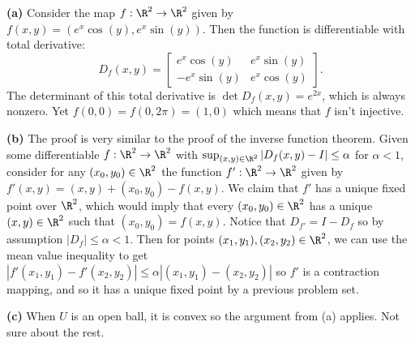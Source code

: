 \documentclass[11pt,letterpaper]{article}
\begin{document}
\begin{solution}
    \textbf{(a)} Consider the map $f : \R^2 \to \R^2$ given by $f(x,y)=(e^x\cos(y), e^x\sin(y))$. Then the function is differentiable with total derivative:
    \[
        D_f(x,y)=\begin{bmatrix}
            e^x\cos(y)& e^x\sin(y)\\ -e^x\sin(y)&e^x\cos(y)
        \end{bmatrix}
    .\]
    The determinant of this total derivative is $\det D_f(x,y)=e^{2x}$, which is always nonzero. Yet $f(0,0)=f(0,2\pi)=(1,0)$ which means that $f$ isn't injective.
    
    \textbf{(b)} The proof is very similar to the proof of the inverse function theorem. Given some differentiable $f : \R^2\to \R^2$ with $\sup_{(x,y)\in \R^2}|D_f(x,y) - I|\leq \alpha$ for $\alpha < 1$, consider for any $(x_0,y_0)\in \R^2$ the function $f' : \R^2 \to \R^2$ given by $f'(x,y)=(x,y)+(x_0,y_0)-f(x,y)$. We claim that $f'$ has a unique fixed point over $\R^2$, which would imply that every $(x_0,y_0)\in \R^2$ has a unique $(x,y)\in \R^2$ such that $(x_0, y_0)=f(x,y)$. Notice that $D_{f'} = I - D_f$ so by assumption $|D_f|\leq \alpha<1$. Then for points $(x_1,y_1), (x_2,y_2)\in \R^2$, we can use the mean value inequality to get $|f'(x_1,y_1)-f'(x_2,y_2)|\leq \alpha|(x_1,y_1)-(x_2,y_2)|$ so $f'$ is a contraction mapping, and so it has a unique fixed point by a previous problem set.
    
    \textbf{(c)} When $U$ is an open ball, it is convex so the argument from (a) applies. Not sure about the rest.
\end{solution}
\end{document}
